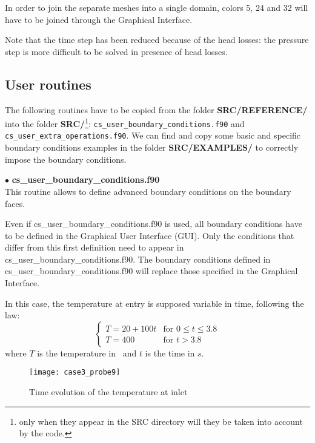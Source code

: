 In order to join the separate meshes into a single domain, colors 5, 24 and 32
will have to be joined through the Graphical Interface.

Note that the time step has been reduced because of the head losses: the pressure step is more difficult
to be solved in presence of head losses.


        \subsection{User routines}

The following routines have to be copied from the folder \textbf{SRC/REFERENCE/} into the
folder \textbf{SRC/}\footnote{only when they appear in the SRC directory will they be
taken into account by the code.}: \texttt{cs\_user\_boundary\_conditions.f90} and
\texttt{cs\_user\_extra\_operations.f90}.
We can find and copy some basic and specific boundary conditions examples in the folder
\textbf{SRC/EXAMPLES/} to correctly impose the \CS boundary conditions.

$\bullet$ {\bfseries cs\_user\_boundary\_conditions.f90}\\
This routine allows to define advanced boundary conditions on the boundary faces.

Even if cs\_user\_boundary\_conditions.f90 is used, all boundary conditions have
to be defined in the Graphical User Interface (GUI). Only the conditions that differ
from this first definition need to appear in cs\_user\_boundary\_conditions.f90.
The boundary conditions defined in cs\_user\_boundary\_conditions.f90 will replace those
specified in the Graphical Interface.

In this case, the temperature at entry is supposed variable in time, following
the law:
\begin{equation}
\left\{\begin{array}{ll}
T = 20 + 100t & \text{for }0\leqslant t \leqslant 3.8\\
T = 400 & \text{for } t > 3.8
\end{array}\right.
\end{equation}
where $T$ is the temperature in \degresC\ and $t$ is the time in $s$.


\begin{figure}[h!]
\begin{center}
\texttt{[image: case3\_probe9]}
\caption{Time evolution of the temperature at inlet}
\label{figp9_e4}
\end{center}
\end{figure}


